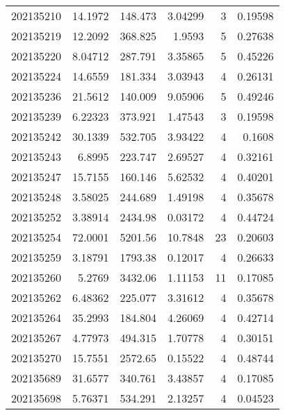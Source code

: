 \begin{tabular}{rrrrrr}
 202135210 &         14.1972  &      148.473  &            3.04299 &           3 & 0.19598 \\
 202135219 &         12.2092  &      368.825  &            1.9593  &           5 & 0.27638 \\
 202135220 &          8.04712 &      287.791  &            3.35865 &           5 & 0.45226 \\
 202135224 &         14.6559  &      181.334  &            3.03943 &           4 & 0.26131 \\
 202135236 &         21.5612  &      140.009  &            9.05906 &           5 & 0.49246 \\
 202135239 &          6.22323 &      373.921  &            1.47543 &           3 & 0.19598 \\
 202135242 &         30.1339  &      532.705  &            3.93422 &           4 & 0.1608  \\
 202135243 &          6.8995  &      223.747  &            2.69527 &           4 & 0.32161 \\
 202135247 &         15.7155  &      160.146  &            5.62532 &           4 & 0.40201 \\
 202135248 &          3.58025 &      244.689  &            1.49198 &           4 & 0.35678 \\
 202135252 &          3.38914 &     2434.98   &            0.03172 &           4 & 0.44724 \\
 202135254 &         72.0001  &     5201.56   &           10.7848  &          23 & 0.20603 \\
 202135259 &          3.18791 &     1793.38   &            0.12017 &           4 & 0.26633 \\
 202135260 &          5.2769  &     3432.06   &            1.11153 &          11 & 0.17085 \\
 202135262 &          6.48362 &      225.077  &            3.31612 &           4 & 0.35678 \\
 202135264 &         35.2993  &      184.804  &            4.26069 &           4 & 0.42714 \\
 202135267 &          4.77973 &      494.315  &            1.70778 &           4 & 0.30151 \\
 202135270 &         15.7551  &     2572.65   &            0.15522 &           4 & 0.48744 \\
 202135689 &         31.6577  &      340.761  &            3.43857 &           4 & 0.17085 \\
 202135698 &          5.76371 &      534.291  &            2.13257 &           4 & 0.04523 \\

\end{tabular}
